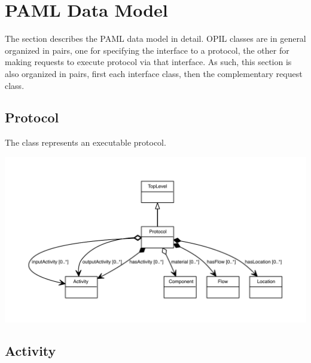 
\section{PAML Data Model}\label{sec:model}

The section describes the PAML data model in detail.  
OPIL classes are in general organized in pairs, one for specifying the interface to a protocol, the other for making requests to execute protocol via that interface.
As such, this section is also organized in pairs, first each interface class, then the complementary request class.

\subsection{Protocol}
\label{sec:Protocol}

The  class represents an executable protocol.


\begin{center}
\includegraphics[scale=0.8]{uml/Protocol_abstraction_hierarchy.pdf}
\end{center}


\subsection{Activity}
\label{sec:Activity}

%


